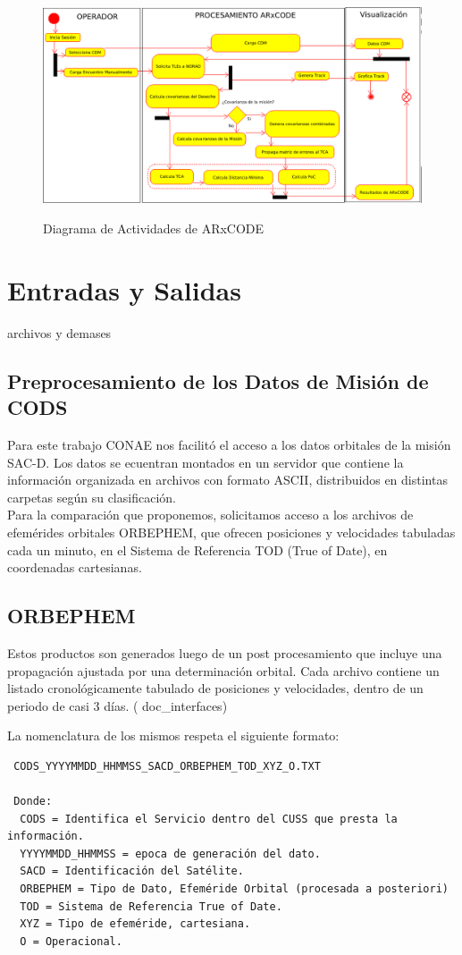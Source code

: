 \begin{figure}[h!]
  \centering
  \includegraphics[width=\textwidth]{imagenes/actdiagAR}
  \label{fig:actdiag}
  \caption{Diagrama de Actividades de ARxCODE}
\end{figure}

\section{Entradas y Salidas}

archivos y demases

\subsection*{Preprocesamiento de los Datos de Misi\'on de CODS}
Para este trabajo CONAE nos facilit\'o el acceso a los datos orbitales de la misi\'on SAC-D.
Los datos se ecuentran montados en un servidor que contiene la informaci\'on organizada en archivos con formato ASCII, distribuidos en distintas carpetas seg\'un su clasificaci\'on.\\
Para la comparaci\'on que proponemos, solicitamos acceso a los archivos de efem\'erides orbitales ORBEPHEM, que ofrecen posiciones y velocidades tabuladas cada un minuto, en el Sistema de Referencia TOD (True of Date), en coordenadas cartesianas.

\subsection*{ORBEPHEM}
Estos productos son generados luego de un post procesamiento que incluye una propagaci\'on ajustada por una determinaci\'on orbital. 
Cada archivo contiene un listado cronol\'ogicamente tabulado de posiciones y velocidades, dentro de un periodo de casi 3 d\'ias. ( doc\_interfaces)

La nomenclatura de los mismos respeta el siguiente formato:\\
\begin{verbatim}
 CODS_YYYYMMDD_HHMMSS_SACD_ORBEPHEM_TOD_XYZ_O.TXT
 
 Donde:
  CODS = Identifica el Servicio dentro del CUSS que presta la información.
  YYYYMMDD_HHMMSS = epoca de generación del dato.
  SACD = Identificación del Satélite.
  ORBEPHEM = Tipo de Dato, Efeméride Orbital (procesada a posteriori)
  TOD = Sistema de Referencia True of Date.
  XYZ = Tipo de efeméride, cartesiana.
  O = Operacional. 
\end{verbatim}


